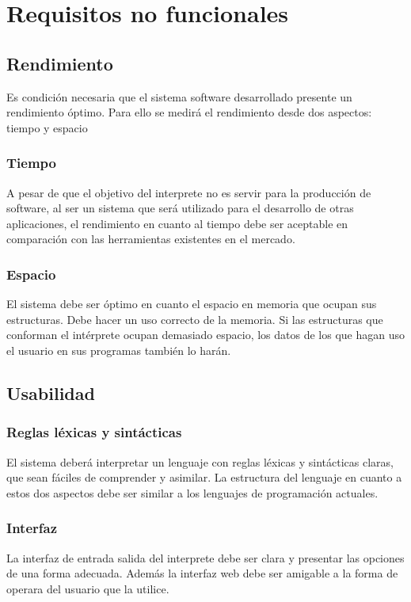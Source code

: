 \section{Requisitos no funcionales}
\subsection{Rendimiento}
Es condición necesaria que el sistema software desarrollado presente un rendimiento óptimo. Para ello se medirá el rendimiento 
desde dos aspectos: tiempo y espacio
\subsubsection{Tiempo}
A pesar de que el objetivo del interprete no es servir para la producción de software, al ser un sistema que será utilizado para el 
desarrollo de otras aplicaciones, el rendimiento en cuanto al tiempo debe ser aceptable en comparación con las herramientas existentes en 
el mercado. 

\subsubsection{Espacio}
El sistema debe ser óptimo en cuanto el espacio en memoria que ocupan sus estructuras. Debe hacer un uso correcto de la memoria. 
Si las estructuras que conforman el intérprete ocupan demasiado espacio, los datos de los que hagan uso el usuario en sus programas también lo
harán.

\subsection{Usabilidad}
\subsubsection{Reglas léxicas y sintácticas}
El sistema deberá interpretar un lenguaje con reglas léxicas y sintácticas claras, que sean fáciles de comprender y asimilar. La estructura del 
lenguaje en cuanto a estos dos aspectos debe ser similar a los lenguajes de programación actuales. 
\subsubsection{Interfaz}
La interfaz de entrada salida del interprete debe ser clara y presentar las opciones de una forma adecuada. Además la interfaz web debe 
ser amigable a la forma de operara del usuario que la utilice.

